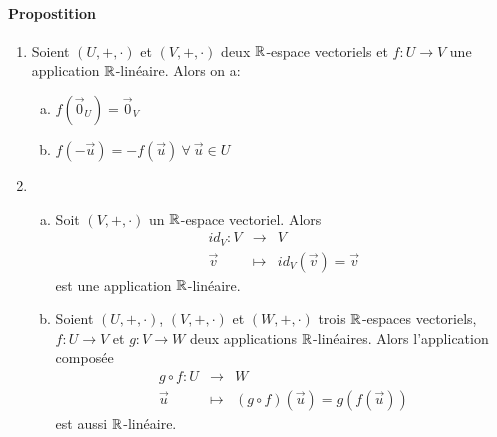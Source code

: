 \paragraph{Propostition}
\begin{enumerate} 
  \item Soient $(U, +, \cdot)$ et $(V, +, \cdot)$ deux $\mathbb{R}$-espace vectoriels et $f: U \rightarrow V$ une application $\mathbb{R}$-linéaire. Alors on a:
    \begin{enumerate}[a)] 
      \item $f(\vec{0}_U) = \vec{0}_V$
      \item $f(-\vec{u}) = -f(\vec{u}) ~\forall~ \vec{u} \in U$
    \end{enumerate}
  \item 
    \begin{enumerate}[a)]
      \item Soit $(V, +, \cdot)$ un $\mathbb{R}$-espace vectoriel. Alors
        \begin{eqnarray*}
          id_V: V &\rightarrow& V \\
          \vec{v} &\mapsto& id_{V}(\vec{v}) = \vec{v}
        \end{eqnarray*}
        est une application $\mathbb{R}$-linéaire.
      \item Soient $(U, +, \cdot)$, $(V, +, \cdot)$ et $(W, +, \cdot)$  trois $\mathbb{R}$-espaces vectoriels, $f: U \rightarrow V$ et $g: V \rightarrow W$ deux applications $\mathbb{R}$-linéaires. Alors l'application composée
        \begin{eqnarray*}
          g \circ f: U &\rightarrow& W \\
          \vec{u} &\mapsto& (g \circ f)(\vec{u}) = g(f(\vec{u}))
        \end{eqnarray*}
        est aussi $\mathbb{R}$-linéaire.
    \end{enumerate}
\end{enumerate}

